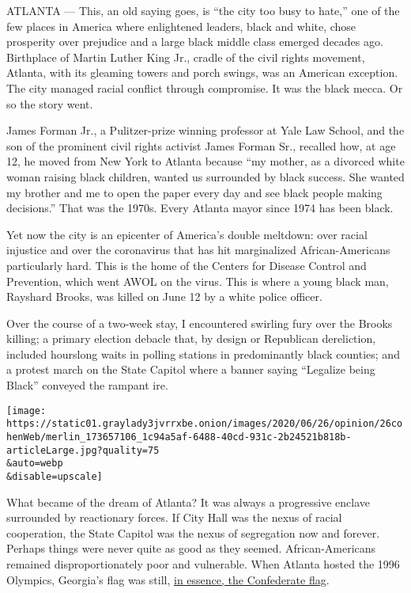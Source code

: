 ATLANTA --- This, an old saying goes, is ``the city too busy to hate,''
one of the few places in America where enlightened leaders, black and
white, chose prosperity over prejudice and a large black middle class
emerged decades ago. Birthplace of Martin Luther King Jr., cradle of the
civil rights movement, Atlanta, with its gleaming towers and porch
swings, was an American exception. The city managed racial conflict
through compromise. It was the black mecca. Or so the story went.

James Forman Jr., a Pulitzer-prize winning professor at Yale Law School,
and the son of the prominent civil rights activist James Forman Sr.,
recalled how, at age 12, he moved from New York to Atlanta because ``my
mother, as a divorced white woman raising black children, wanted us
surrounded by black success. She wanted my brother and me to open the
paper every day and see black people making decisions.'' That was the
1970s. Every Atlanta mayor since 1974 has been black.

Yet now the city is an epicenter of America's double meltdown: over
racial injustice and over the coronavirus that has hit marginalized
African-Americans particularly hard. This is the home of the Centers for
Disease Control and Prevention, which went AWOL on the virus. This is
where a young black man, Rayshard Brooks, was killed on June 12 by a
white police officer.

Over the course of a two-week stay, I encountered swirling fury over the
Brooks killing; a primary election debacle that, by design or Republican
dereliction, included hourslong waits in polling stations in
predominantly black counties; and a protest march on the State Capitol
where a banner saying ``Legalize being Black'' conveyed the rampant ire.

\texttt{[image: https://static01.graylady3jvrrxbe.onion/images/2020/06/26/opinion/26cohenWeb/merlin\_173657106\_1c94a5af-6488-40cd-931c-2b24521b818b-articleLarge.jpg?quality=75\\\&auto=webp\\\&disable=upscale]}

What became of the dream of Atlanta? It was always a progressive enclave
surrounded by reactionary forces. If City Hall was the nexus of racial
cooperation, the State Capitol was the nexus of segregation now and
forever. Perhaps things were never quite as good as they seemed.
African-Americans remained disproportionately poor and vulnerable. When
Atlanta hosted the 1996 Olympics, Georgia's flag was still,
\href{https://www.latimes.com/archives/la-xpm-1996-07-19-mn-25755-story.html}{in
essence, the Confederate flag}.

